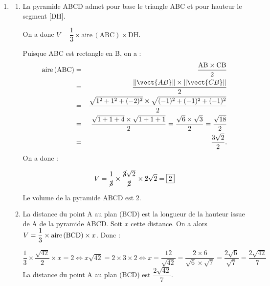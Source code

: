 \begin{enumerate}
\begin{enumerate}
\[\boxed{\mathrm{H}\,(7~;~-1~;~1)}\]

		\item \quad $\mathrm{DH} = \sqrt{(7-5)^2 + (-1-1)^2 + (1 - 1)^2} = \sqrt{2^2 + (-2)^2 + 0^2} = \sqrt{4+4} = \sqrt{8} = \boxed{2\sqrt{2}}$
	\end{enumerate}

\item
	\begin{enumerate}
		\item La pyramide ABCD admet pour base le triangle ABC et pour hauteur le segment [DH].
		
		On a donc $V = \dfrac{1}{3} \times \text{aire}\,(\mathrm{ABC}) \times \mathrm{DH}$.

Puisque ABC est rectangle en B, on a :
\begin{eqnarray*}
\text{aire}\,(\text{ABC}) &=& \dfrac{\mathrm{AB}\times\mathrm{CB}}{2} \\
&=& \dfrac{\|\vect{AB}\| \times \|\vect{CB}\|}{2}\\
&=& \dfrac{\sqrt{1^2 + 1^2 + (-2)^2} \times \sqrt{(-1)^2 + (-1)^2 + (-1)^2}}{2}\\
&=& \dfrac{\sqrt{1+1+4}\times\sqrt{1+1+1}}{2} = \dfrac{\sqrt{6}\times\sqrt{3}}{2} = \dfrac{\sqrt{18}}{2}\\
&=& \dfrac{3\sqrt{2}}{2}.
\end{eqnarray*}
On a donc :

\[V = \dfrac{1}{\cancel{3}} \times \dfrac{\cancel{3}\sqrt{2}}{\cancel{2}} \times \cancel{2}\sqrt{2} = \boxed{2}\]

Le volume de la pyramide ABCD est $2$.
		\item La distance du point A au plan (BCD) est la longueur de la hauteur issue de A de la pyramide ABCD. Soit $x$ cette distance. On a alors $V = \dfrac{1}{3} \times \text{aire\,(BCD)} \times x$. Donc :

\[\dfrac{1}{3} \times \dfrac{\sqrt{42}}{2} \times x = 2 \iff x\sqrt{42} = 2 \times 3 \times 2 \iff x = \dfrac{12}{\sqrt{42}} = \dfrac{2\times6}{\sqrt{6} \times \sqrt{7}} = \dfrac{2\sqrt{6}}{\sqrt{7}} = \boxed{\dfrac{2\sqrt{42}}{7}}\]
La distance du point A au plan (BCD) est $\dfrac{2\sqrt{42}}{7}$.
	\end{enumerate}
\end{enumerate}


\bigskip
